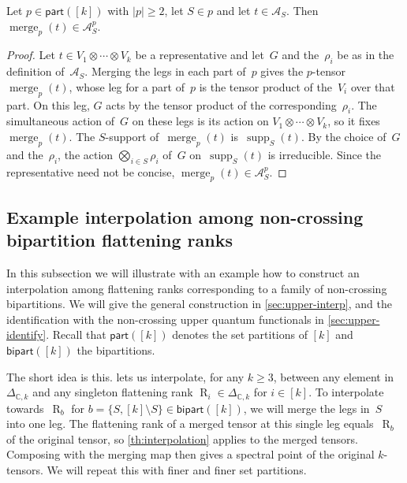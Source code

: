 \documentclass[11pt,letterpaper]{article}
\DeclareMathOperator{\supp}{supp}
\DeclareMathOperator{\tensorrank}{R}
\DeclareMathOperator{\merge}{merge}
\newcommand{\parts}{\mathsf{part}}
\newcommand{\bipart}{\mathsf{bipart}}
\newcommand{\CC}{\mathbb{C}}
\begin{document}
\begin{lemma}\label{lem:merge-family}
Let $p \in \parts([k])$ with $|p| \geq 2$, let $S \in p$ and let $t \in \mathcal{A}_S$. Then $\merge_{p}(t) \in \mathcal{A}^p_S$.
\end{lemma}
\begin{proof}
Let $t \in V_1 \otimes \cdots \otimes V_k$ be a representative and let~$G$ and the~$\rho_i$ be as in the definition of~$\mathcal{A}_S$. Merging the legs in each part of~$p$ gives the $p$-tensor $\merge_{p}(t)$, whose leg for a part of~$p$ is the tensor product of the~$V_i$ over that part. On this leg, $G$ acts by the tensor product of the corresponding~$\rho_i$. The simultaneous action of~$G$ on these legs is its action on $V_1 \otimes \cdots \otimes V_k$, so it fixes~$\merge_{p}(t)$. The $S$-support of~$\merge_{p}(t)$ is~$\supp_S(t)$. By the choice of~$G$ and the~$\rho_i$, the action $\bigotimes_{i \in S} \rho_i$ of~$G$ on~$\supp_S(t)$ is irreducible. Since the representative need not be concise, $\merge_{p}(t) \in \mathcal{A}^p_S$.
\end{proof}

\subsection{Example interpolation among non-crossing bipartition flattening ranks}\label{sec:upper-example}

In this subsection we will illustrate with an example how to construct an interpolation among flattening ranks corresponding to a family of non-crossing bipartitions. We will give the general construction in \cref{sec:upper-interp}, and the identification with the non-crossing upper quantum functionals in \cref{sec:upper-identify}. Recall that $\parts([k])$ denotes the set partitions of $[k]$ and $\bipart([k])$ the bipartitions.

The short idea is this.
 lets us interpolate, for any $k\geq3$, between any element in $\Delta_{\CC,k}$ and any singleton flattening rank $\tensorrank_i \in \Delta_{\CC,k}$ for $i \in [k]$. To interpolate towards~$\tensorrank_b$ for $b = \{S, [k] \setminus S\} \in \bipart([k])$, we will merge the legs in~$S$ into one leg. The flattening rank of a merged tensor at this single leg equals~$\tensorrank_b$ of the original tensor, so \cref{th:interpolation} applies to the merged tensors. Composing with the merging map then gives a spectral point of the original $k$-tensors. We will repeat this with finer and finer set partitions.
\end{document}
